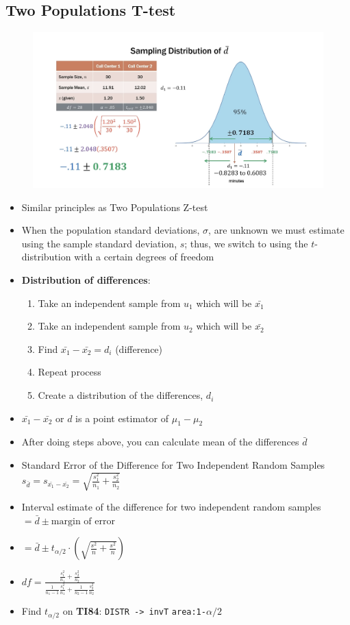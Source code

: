 \documentclass{article}
\newcommand{\code}[1]{\colorbox{light-gray}{\texttt{#1}}}
\begin{document}
\subsection{Two Populations T-test}

\begin{figure}[H]
    \centering
    \includegraphics[width=1\linewidth]{2samptexample.png}
\end{figure}

\begin{itemize}
    \item Similar principles as Two Populations Z-test
    \item When the population standard deviations, $\sigma$, are unknown we must estimate using the sample standard deviation, $s$; thus, we switch to using the $t$-distribution with a certain degrees of freedom
    \item \textbf{Distribution of differences}:
    \begin{enumerate}
        \item Take an independent sample from $u_1$ which will be $\bar{x_1}$
        \item Take an independent sample from $u_2$ which will be $\bar{x_2}$
        \item Find $\bar{x_1}-\bar{x_2}=d_i$ (difference)
        \item Repeat process
        \item Create a distribution of the differences, $d_i$ 
    \end{enumerate}
    \item $\bar{x_1}-\bar{x_2}$ or $d$ is a point estimator of $\mu_1-\mu_2$
    \item After doing steps above, you can calculate mean of the differences $\bar{d}$
    \item Standard Error of the Difference for Two Independent Random Samples $s_{\bar{d}}=s_{\bar{x_1}-\bar{x_2}}=\sqrt{\frac{s_1^2}{n_1}+\frac{s_2^2}{n_2}}$
    \item Interval estimate of the difference for two independent random samples $=\bar{d} \pm \text{margin of error}$
    \item $=\bar{d} \pm t_{\alpha/2} \cdot (\sqrt{\frac{s^2}{n}+\frac{s^2}{n}})$
    \item $df=\frac{\frac{s_1^2}{n_1}+\frac{s_2^2}{n_2}}{\frac{1}{n_1-1}\frac{s_1^2}{n_1}+\frac{1}{n_2-1}\frac{s_2^2}{n_2}}$
    \item Find $t_{\alpha/2}$ on \textbf{TI84}: \code{DISTR -> invT} \code{area:1-$\alpha/2$}
\end{itemize}
\end{document}
